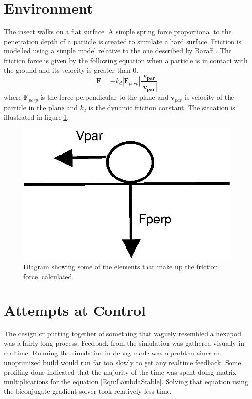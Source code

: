 \section{Environment}
The insect walks on a flat surface. A simple spring force proportional to the
penetration depth of a particle is created to simulate a hard surface. Friction
is modelled using a simple model relative to the one described by Baraff 
\cite{BaraffFriction}. The friction force is given by the following equation
when a particle is in contact with the ground and its velocity is greater than
0.
\[
\mathbf{F} = -k_d|\mathbf{F}_{perp}|\frac{\mathbf{v_{par}}}{|\mathbf{v_{par}}|}
\]
where $\mathbf{F}_{perp}$ is the force perpendicular to the plane and
$\mathbf{v}_{par}$ is velocity of the particle in the plane and $k_d$ is the
dynamic friction constant. The situation is illustrated in figure
\ref{Fig:Friction}.
\begin{figure}
    \centering
    \includegraphics[height=0.125\textheight]{Friction}
    \caption{\label{Fig:Friction}Diagram showing some of the elements that make
    up the friction force.
    calculated.}
\end{figure}

\section{Attempts at Control}
The design or putting together of something that vaguely resembled a hexapod was
a fairly long process. Feedback from the simulation was gathered visually in
realtime. Running the simulation in debug mode was a problem since an
unoptimized build would run far too slowly to get any realtime feedback. Some
profiling done indicated that the majority of the time was spent doing matrix
multiplications for the equation \ref{Eqn:LambdaStable}. Solving that equation
using the biconjugate gradient solver took relatively less time.


